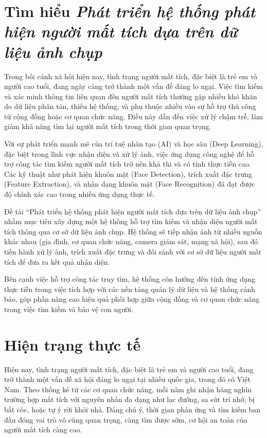 \documentclass[../DoAn.tex]{subfiles}
\begin{document}
\section{Tìm hiểu \textit{Phát triển hệ thống phát hiện người mất tích dựa trên dữ liệu ảnh chụp}}
Trong bối cảnh xã hội hiện nay, tình trạng người mất tích, đặc biệt là trẻ em và người cao tuổi, đang ngày càng trở thành một vấn đề đáng lo ngại. Việc tìm kiếm và xác minh thông tin liên quan đến người mất tích thường gặp nhiều khó khăn do dữ liệu phân tán, thiếu hệ thống, và phụ thuộc nhiều vào sự hỗ trợ thủ công từ cộng đồng hoặc cơ quan chức năng. Điều này dẫn đến việc xử lý chậm trễ, làm giảm khả năng tìm lại người mất tích trong thời gian quan trọng.

Với sự phát triển mạnh mẽ của trí tuệ nhân tạo (AI) và học sâu (Deep Learning), đặc biệt trong lĩnh vực nhận diện và xử lý ảnh, việc ứng dụng công nghệ để hỗ trợ công tác tìm kiếm người mất tích trở nên khả thi và có tính thực tiễn cao. Các kỹ thuật như phát hiện khuôn mặt (Face Detection), trích xuất đặc trưng (Feature Extraction), và nhận dạng khuôn mặt (Face Recognition) đã đạt được độ chính xác cao trong nhiều ứng dụng thực tế.

Đề tài “Phát triển hệ thống phát hiện người mất tích dựa trên dữ liệu ảnh chụp” nhằm mục tiêu xây dựng một hệ thống hỗ trợ tìm kiếm và nhận diện người mất tích thông qua cơ sở dữ liệu ảnh chụp. Hệ thống sẽ tiếp nhận ảnh từ nhiều nguồn khác nhau (gia đình, cơ quan chức năng, camera giám sát, mạng xã hội), sau đó tiến hành xử lý ảnh, trích xuất đặc trưng và đối sánh với cơ sở dữ liệu người mất tích để đưa ra kết quả nhận diện.

Bên cạnh việc hỗ trợ công tác truy tìm, hệ thống còn hướng đến tính ứng dụng thực tiễn trong việc tích hợp với các nền tảng quản lý dữ liệu và hệ thống cảnh báo, góp phần nâng cao hiệu quả phối hợp giữa cộng đồng và cơ quan chức năng trong việc tìm kiếm và bảo vệ con người.

\section{Hiện trạng thực tế}
Hiện nay, tình trạng người mất tích, đặc biệt là trẻ em và người cao tuổi, đang trở thành một vấn đề xã hội đáng lo ngại tại nhiều quốc gia, trong đó có Việt Nam. Theo thống kê từ các cơ quan chức năng, mỗi năm ghi nhận hàng nghìn trường hợp mất tích với nguyên nhân đa dạng như lạc đường, sa sút trí nhớ, bị bắt cóc, hoặc tự ý rời khỏi nhà. Đáng chú ý, thời gian phản ứng và tìm kiếm ban đầu đóng vai trò vô cùng quan trọng, càng tìm được sớm, cơ hội an toàn của người mất tích càng cao.
\end{document}
